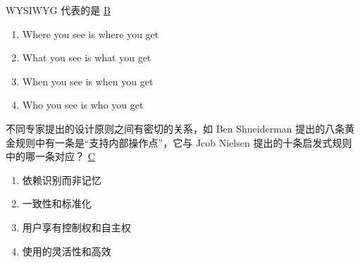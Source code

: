 \begin{problem}
	WYSIWYG 代表的是
	\uline{B}    
    \vspace{-0.8em}
    \begin{multicols}{2}
        \begin{enumerate}[label=\Alph*.]
            \item Where you see is where you get
            \item What you see is what you get
            \item When you see is when you get
            \item Who you see is who you get
        \end{enumerate}
    \end{multicols}
    \vspace{-1em}
\end{problem}



\begin{problem}
	不同专家提出的设计原则之间有密切的关系，如 Ben Shneiderman 提出的八条黄金规则中有一条是“支持内部操作点”，它与 Jcob Nielsen 提出的十条启发式规则中的哪一条对应？
	\uline{C}    
    \vspace{-0.8em}
    \begin{multicols}{2}
        \begin{enumerate}[label=\Alph*.]
            \item 依赖识别而非记忆
            \item  一致性和标准化
            \item 用户享有控制权和自主权
            \item 使用的灵活性和高效
        \end{enumerate}
    \end{multicols}
    \vspace{-1em}
\end{problem}



